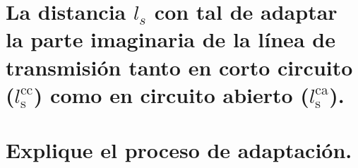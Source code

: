 \documentclass[
  11pt,
  letterpaper,
  answers
]{exam}
\begin{document}
\begin{questions}
\begin{parts}
        \part[4]{La distancia $l_s$ con tal de adaptar la parte imaginaria de la línea de transmisión tanto en corto circuito ($l_\text{s}^\text{cc}$) como en circuito abierto ($l_\text{s}^\text{ca}$).}
    
        \part[3]{Explique el proceso de adaptación.}
      \end{parts}
    
    \begin{solution}

        
      



    \end{solution}
    
  \end{questions}
\end{document}
